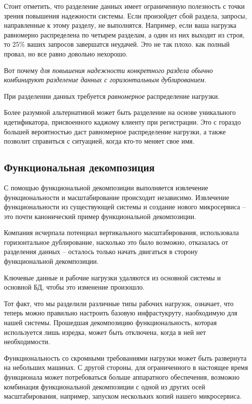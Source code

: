 \documentclass[%
	11pt,
	a4paper,
	utf8,
		]{article}
\begin{document}
Стоит отметить, что разделение данных имеет ограниченную полезность с точки зрения повышения надежности системы. Если произойдет сбой раздела, запросы, направленные к этому разделу, не выполнятся. Например, если ваша нагрузка равномерно распределена по четырем разделам, а один из них выходит из строя, то 25\% ваших запросов завершатся неудачей. Это не так плохо. как полный провал, но все равно довольно нехорошо.

{\color{blue}Вот почему \emph{для повышения надежности конкретного раздела обычно комбинируют разделение данных с горизонтальным дублированием}.}

{\color{blue} При разделении данных требуется \emph{равномерное} распределение нагрузки.}

Более разумной альтернативой может быть разделение на основе уникального идетификатора, присвоенного каджому клиенту при регистрации. Это с гораздо большей вероятностью даст равномерное распределение нагрузки, а также позволит справиться с ситуацией, когда кто-то меняет свое имя.

\subsection{Функциональная декомпозиция}

С помощью функциональной декомпозиции выполняется извлечение функциональности и масштабирование происходит независимо. Извлечение функциональности из существующей системы и создание нового микросервиса -- это почти канонический пример функциональной декомпозиции.

Компания исчерпала потенциал вертикального масштабирования, использовала горизонтальное дублирование, насколько это было возможно, отказалась от разделения данных -- осталось только начать двигаться в сторону функциональной декомпозиции.

Ключевые данные и рабочие нагрузки удаляются из основной системы и основной БД, чтобы это изменение произошло.

Тот факт, что мы разделили различные типы рабочих нагрузок, означает, что теперь можно правильно настроить базовую инфрастукруту, наобходимую для нашей системы. Прошедшая декомпозицию функциональность, которая используется лишь изредка, может быть отключена, когда в ней нет необходимости. 

Функциональность со скромными требованиями нагрузки может быть развернута на небольших машинах. С другой стороны, для ограниченного в настоящее время функционала может потребоваться больше аппаратного обеспечения, возможно комбинация функциональной декомпозиции с одной из других осей масштабирования, например, запуском нескольких копий нашего микросервиса.
\end{document}
